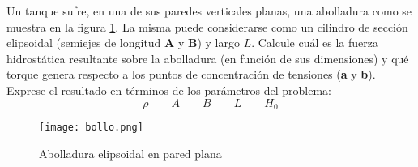 \item Un tanque sufre, en una de sus paredes verticales planas, una abolladura
como se muestra en la figura \ref{fig:bollo}. La misma puede considerarse
como un cilindro de sección elipsoidal (semiejes  de longitud \textbf{A} y
\textbf{B}) y largo $L$. Calcule cuál es la fuerza hidrostática resultante
sobre la abolladura (en función de sus dimensiones) y qué torque genera
respecto a los puntos de concentración de tensiones (\textbf{a} y \textbf{b}). Exprese el resultado en términos de los parámetros del problema:
\begin{equation*}
\rho \qquad A \qquad B \qquad L \qquad H_0
\end{equation*}

\begin{figure}[h!!!!]
  \centering
  \texttt{[image: bollo.png]}
  \caption{Abolladura elipsoidal en pared plana}
  \label{fig:bollo}
\end{figure}

